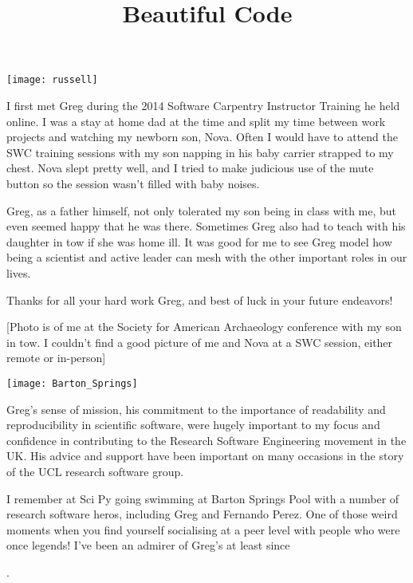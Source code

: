 \newpage
\vspace*{\fill}
\begin{minipage}{0.45\textwidth}
    \texttt{[image: russell]}
\end{minipage}
\hfill
\begin{minipage}{0.45\textwidth}
\setlength{\parindent}{0in}
\setlength{\parskip}{1em}
I first met Greg during the 2014 Software Carpentry Instructor Training he held
online. I was a stay at home dad at the time and split my time between work
projects and watching my newborn son, Nova. Often I would have to attend
the SWC training sessions with my son napping in his baby carrier strapped
to my chest. Nova slept pretty well, and I tried to make judicious use of
the mute button so the session wasn't filled with baby noises. 

Greg, as a father himself, not only tolerated my son being in class with
me, but even seemed happy that he was there. Sometimes Greg also had to
teach with his daughter in tow if she was home ill. It was good for me to
see Greg model how being a scientist and active leader can mesh with the
other important roles in our lives. 

Thanks for all your hard work Greg, and best of luck in your future endeavors! 

[Photo is of me at the Society for American Archaeology conference with my son
in tow. I couldn't find a good picture of me and Nova at a SWC session, either
remote or in-person]

\end{minipage}
\vspace*{\fill}

\newpage
\vspace*{\fill}

\texttt{[image: Barton\_Springs]}

Greg's sense of mission, his commitment to the importance of readability and
reproducibility in scientific software, were hugely important to my focus and
confidence in contributing to the Research Software Engineering movement in the
UK. His advice and support have been important on many occasions in the story
of the UCL research software group.

I remember at Sci Py going swimming at Barton Springs Pool with a number of
research software heros, including Greg and Fernando Perez. One of those weird
moments when you find yourself socialising at a peer level with people who were
once legends! I've been an admirer of Greg's at least since \title{Beautiful
Code}.

